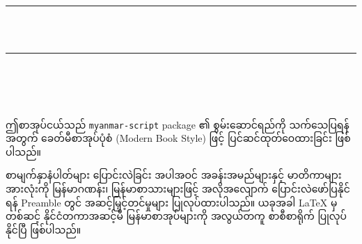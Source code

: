 \documentclass[11pt, a4paper, openany]{book} %
\begin{document}
\frontmatter

\begin{titlepage}
    \begin{center}
        \vspace*{4cm}
        
        {\color{brandcolor}\rule{\linewidth}{2mm}}\\[1.5em]
        
        {\Huge\bfseries{}}\\[1em]
        
        {\Large{}}
        
        \vspace{1.5em}
        {\color{brandcolor}\rule{\linewidth}{2mm}}
        
        \vfill
        
        {\Large{}}\\[0.5em]
        {\Large \textbf{}}\\[2em]
        
        {\large{}}
    \end{center}
\end{titlepage}

\chapter*{}

\begin{myanmar}
ဤစာအုပ်ငယ်သည် \texttt{myanmar-script} package ၏ စွမ်းဆောင်ရည်ကို သက်သေပြရန်အတွက် ခေတ်မီစာအုပ်ပုံစံ (Modern Book Style) ဖြင့် ပြင်ဆင်ထုတ်ဝေထားခြင်း ဖြစ်ပါသည်။ 

စာမျက်နှာနံပါတ်များ ပြောင်းလဲခြင်း အပါအဝင် အခန်းအမည်များနှင့် မာတိကာများအားလုံးကို မြန်မာဂဏန်း၊ မြန်မာစာသားများဖြင့် အလိုအလျောက် ပြောင်းလဲဖော်ပြနိုင်ရန် Preamble တွင် အဆင့်မြှင့်တင်မှုများ ပြုလုပ်ထားပါသည်။ ယခုအခါ LaTeX မှတစ်ဆင့် နိုင်ငံတကာအဆင့်မီ မြန်မာစာအုပ်များကို အလွယ်တကူ စာစီစာရိုက် ပြုလုပ်နိုင်ပြီ ဖြစ်ပါသည်။
\end{myanmar}
\end{document}
